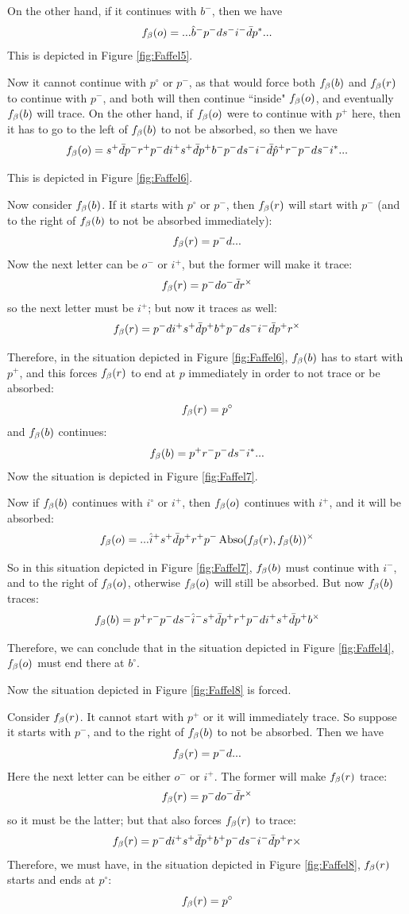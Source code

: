 On the other hand, if it continues with $b^-$, then we have
\[
f_\beta(o) =...\hat{b}^- p^- d s^- i^- \bar{d} p^*... 
\]
This is depicted in Figure \ref{fig:Faffel5}. 

Now it cannot continue with $p^\circ$ or $p^-$, as that would force both $f_\beta(b)$ and $f_\beta(r)$ to continue with $p^-$, and both will then continue ``inside" $f_\beta(o)$, and eventually $f_\beta(b)$ will trace. On the other hand, if $f_\beta(o)$ were to continue with $p^+$ here, then it has to go to the left of $f_\beta(b)$ to not be absorbed, so then we have
\[
f_\beta(o) = s^+ \bar{d} p^- r^+ p^- d i^+ s^+ \bar{d} p^+ b^- p^- d s^- i^- \bar{d} \hat{p}^+ r^- p^- d s^- i^*... 
\]

This is depicted in Figure \ref{fig:Faffel6}.

Now consider $f_\beta(b)$. If it starts with $p^\circ$ or $p^-$, then $f_\beta(r)$ will start with $p^-$ (and to the right of $f_\beta(b)$ to not be absorbed immediately):
\[
f_\beta(r) = p^- d...
\]
Now the next letter can be $o^-$ or $i^+$, but the former will make it trace:
\[
f_\beta(r) = p^- d o^- \bar{d} r^\times
\]
so the next letter must be $i^+$; but now it traces as well:
\[
f_\beta(r) = p^- d i^+ s^+ \bar{d} p^+ b^+ p^- d s^- i^- \bar{d} p^+  r^\times
\]

Therefore, in the situation depicted in Figure \ref{fig:Faffel6}, $f_\beta(b)$ has to start with $p^+$, and this forces $f_\beta(r)$ to end at $p$ immediately in order to not trace or be absorbed:
\[
f_\beta(r) = p^\circ
\]
and $f_\beta(b)$ continues:
\[
f_\beta(b) = p^+ r^- p^- d s^- i^*...
\]
Now the situation is depicted in Figure \ref{fig:Faffel7}.

Now if $f_\beta(b)$ continues with $i^\circ$ or $i^+$, then $f_\beta(o)$ continues with $i^+$, and it will be absorbed:
\[
f_\beta(o) = ...\hat{i}^+ s^+ \bar{d} p^+ r^+ p^- \operatorname{Abso}(f_\beta(r), f_\beta(b))^\times
\]

So in this situation depicted in Figure \ref{fig:Faffel7}, $f_\beta(b)$ must continue with $i^-$, and to the right of $f_\beta(o)$, otherwise $f_\beta(o)$ will still be absorbed. But now $f_\beta(b)$ traces:
\[
f_\beta(b) = p^+ r^- p^- d s^- \hat{i}^- s^+ \bar{d} p^+ r^+ p^- d i^+ s^+ \bar{d} p^+ b^\times
\]

Therefore, we can conclude that in the situation depicted in Figure \ref{fig:Faffel4}, $f_\beta(o)$ must end there at $b^\circ$. 

Now the situation depicted in Figure \ref{fig:Faffel8} is forced.

Consider $f_\beta(r)$. It cannot start with $p^+$ or it will immediately trace. So suppose it starts with $p^-$, and to the right of $f_\beta(b)$ to not be absorbed. Then we have
\[
f_\beta(r) = p^- d...
\]
Here the next letter can be either $o^-$ or $i^+$. The former will make $f_\beta(r)$ trace:
\[
f_\beta(r) = p^- d o^- \bar{d} r^\times
\]
so it must be the latter; but that also forces $f_\beta(r)$ to trace:
\[
f_\beta(r) = p^- d i^+ s^+ \bar{d} p^+ b^+ p^- d s^- i^- \bar{d} p^+ r\times
\]
Therefore, we must have, in the situation depicted in Figure \ref{fig:Faffel8}, $f_\beta(r)$ starts and ends at $p^\circ$:
\[
f_\beta(r) = p^\circ
\]

